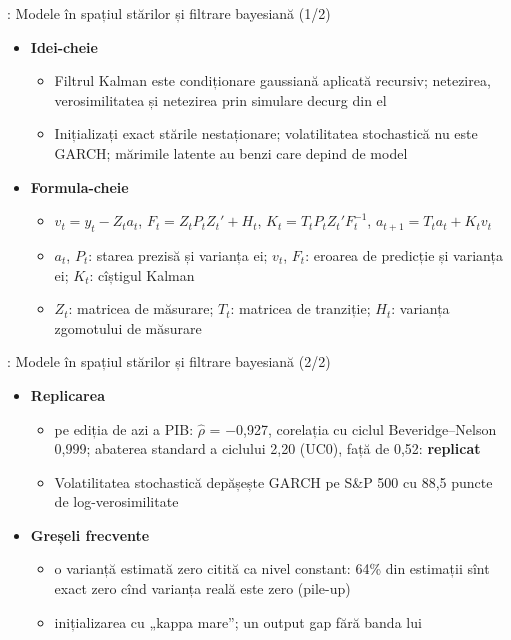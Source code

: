 \begin{frame}{: Modele în spațiul stărilor și filtrare bayesiană (1/2)}
\itemsize{\footnotesize}
\begin{itemize}
    \item \textbf{Idei-cheie}
    \begin{itemize}
        \item Filtrul Kalman este condiționare gaussiană aplicată recursiv; netezirea, verosimilitatea și netezirea prin simulare decurg din el
        \item Inițializați exact stările nestaționare; volatilitatea stochastică nu este GARCH; mărimile latente au benzi care depind de model
    \end{itemize}
    \item \textbf{Formula-cheie}
    \begin{itemize}
        \item $v_t = y_t - Z_ta_t$, $F_t = Z_tP_tZ_t' + H_t$, $K_t = T_tP_tZ_t'F_t^{-1}$, $a_{t+1} = T_ta_t + K_tv_t$
        \item $a_t$, $P_t$: starea prezisă și varianța ei; $v_t$, $F_t$: eroarea de predicție și varianța ei; $K_t$: cîștigul Kalman
        \item $Z_t$: matricea de măsurare; $T_t$: matricea de tranziție; $H_t$: varianța zgomotului de măsurare
    \end{itemize}
\end{itemize}
\end{frame}

\begin{frame}{: Modele în spațiul stărilor și filtrare bayesiană (2/2)}
\itemsize{\small}
\begin{itemize}
    \item \textbf{Replicarea}
    \begin{itemize}
        \item {} pe ediția de azi a PIB: $\hat\rho$ = \ensuremath{-}0{,}927, corelația cu ciclul Beveridge--Nelson 0{,}999; abaterea standard a ciclului 2{,}20 (UC0), față de 0{,}52: \textbf{replicat}
        \item Volatilitatea stochastică depășește GARCH pe S\&P 500 cu 88{,}5 puncte de log-verosimilitate
    \end{itemize}
    \item \textbf{Greșeli frecvente}
    \begin{itemize}
        \item o varianță estimată zero citită ca nivel constant: 64\% din estimații sînt exact zero cînd varianța reală este zero (pile-up)
        \item inițializarea cu „kappa mare”; un output gap fără banda lui
    \end{itemize}
\end{itemize}
\end{frame}

